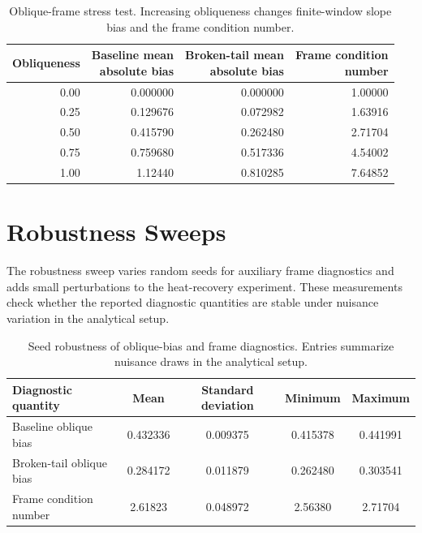 \documentclass{article}
\begin{document}
\begin{table}[H]
\centering
\setlength{\tabcolsep}{3pt}
\caption{Oblique-frame stress test. Increasing obliqueness changes finite-window slope bias and the frame condition number.}
\label{tab:supp-oblique}
\begin{tabular*}{\linewidth}{@{\extracolsep{\fill}}rrrr@{}}
\toprule
Obliqueness & \shortstack{Baseline mean\\absolute bias} & \shortstack{Broken-tail mean\\absolute bias} & \shortstack{Frame condition\\number} \\
\midrule
0.00 & 0.000000 & 0.000000 & 1.00000 \\
0.25 & 0.129676 & 0.072982 & 1.63916 \\
0.50 & 0.415790 & 0.262480 & 2.71704 \\
0.75 & 0.759680 & 0.517336 & 4.54002 \\
1.00 & 1.12440 & 0.810285 & 7.64852 \\
\bottomrule
\end{tabular*}
\end{table}

\section{Robustness Sweeps}
\label{sec:supp-robustness}

The robustness sweep varies random seeds for auxiliary frame diagnostics and adds small perturbations to the heat-recovery experiment. These measurements check whether the reported diagnostic quantities are stable under nuisance variation in the analytical setup.

\begin{table}[H]
\centering
\caption{Seed robustness of oblique-bias and frame diagnostics. Entries summarize nuisance draws in the analytical setup.}
\label{tab:supp-seed-robustness}
\begin{tabular}{lcccc}
\toprule
Diagnostic quantity & Mean & Standard deviation & Minimum & Maximum \\
\midrule
Baseline oblique bias & 0.432336 & 0.009375 & 0.415378 & 0.441991 \\
Broken-tail oblique bias & 0.284172 & 0.011879 & 0.262480 & 0.303541 \\
Frame condition number & 2.61823 & 0.048972 & 2.56380 & 2.71704 \\
\bottomrule
\end{tabular}
\end{table}
\end{document}
